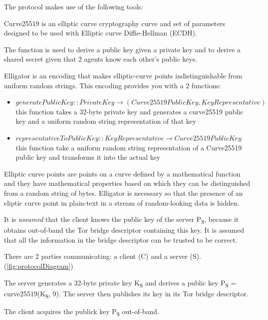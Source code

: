 \documentclass[11pt]{book} %
\begin{document}
The protocol makes use of the following tools:


Curve25519 is an elliptic curve cryptography curve and set of parameters designed to be used with Elliptic curve Diffie-Hellman (ECDH).

The function is used to derive a public key given a private key and to derive a shared secret given that 2 agents know each other's public keys.


Elligator is an encoding that makes elliptic-curve points indistinguishable from uniform random strings. This encoding provides you with a 2 functions: 
\begin{itemize}
\item \( generatePublicKey :: PrivateKey \rightarrow (Curve25519PublicKey, KeyRepresentative) \)
this function takes a 32-byte private key and generates a curve25519 public key and a uniform random string representation of that key
\item \(representativeToPublicKey :: KeyRepresentative \rightarrow Curve25519PublicKey  \)
this function take a uniform random string representation of a Curve25519 public key and transforms it into the actual key
\end{itemize}

Elliptic curve points are points on a curve defined by a mathematical function and they have mathematical properties based on which they can be distinguished from a random string of bytes. Elligator is necessary so that the presence of an eliptic curve point in plain-text in a stream of random-looking data is hidden.


 It is \textit{assumed} that the client knows the public key of the server P\textsubscript{S}, because it obtains out-of-band the Tor bridge descriptor containing this key. It is assumed that all the information in the bridge descriptor can be trusted to be correct.

There are 2 parties communicating: a client (C) and a server (S). (\ref{fig:protocolDiagram})

The server generates a 32-byte private key K\textsubscript{S} and derives a public key P\textsubscript{S} = curve25519(K\textsubscript{S}, 9). The server then publishes its key in its Tor bridge descriptor.

The client acquires the publick key P\textsubscript{S} out-of-band.
\end{document}
